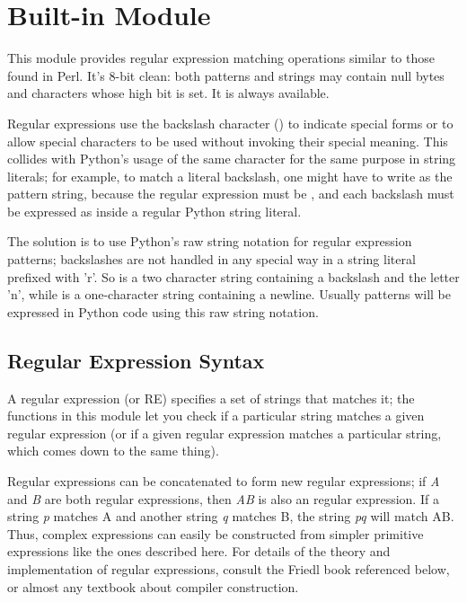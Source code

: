 \section{Built-in Module }
\label{module-re}


This module provides regular expression matching operations similar to
those found in Perl.  It's 8-bit clean: both patterns and strings may
contain null bytes and characters whose high bit is set.  It is always
available.

Regular expressions use the backslash character (\code{\e}) to
indicate special forms or to allow special characters to be used
without invoking their special meaning.  This collides with Python's
usage of the same character for the same purpose in string literals;
for example, to match a literal backslash, one might have to write
\code{\e\e\e\e} as the pattern string, because the regular expression
must be \code{\e\e}, and each backslash must be expressed as
\code{\e\e} inside a regular Python string literal. 

The solution is to use Python's raw string notation for regular
expression patterns; backslashes are not handled in any special way in
a string literal prefixed with 'r'.  So  is a two
character string containing a backslash and the letter 'n', while
 is a one-character string containing a newline.  Usually
patterns will be expressed in Python code using this raw string notation.

\subsection{Regular Expression Syntax}

A regular expression (or RE) specifies a set of strings that matches
it; the functions in this module let you check if a particular string
matches a given regular expression (or if a given regular expression
matches a particular string, which comes down to the same thing).

Regular expressions can be concatenated to form new regular
expressions; if \emph{A} and \emph{B} are both regular expressions,
then \emph{AB} is also an regular expression.  If a string \emph{p}
matches A and another string \emph{q} matches B, the string \emph{pq}
will match AB.  Thus, complex expressions can easily be constructed
from simpler primitive expressions like the ones described here.  For
details of the theory and implementation of regular expressions,
consult the Friedl book referenced below, or almost any textbook about
compiler construction.

